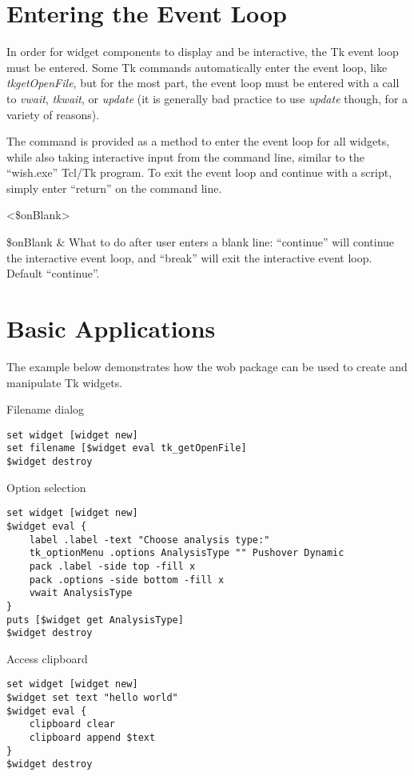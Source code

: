 \documentclass{article}
\renewcommand{\^}[1]{\textsuperscript{#1}}
\renewcommand{\_}[1]{\textsubscript{#1}}
\begin{document}
\section{Entering the Event Loop}
In order for widget components to display and be interactive, the Tk event loop must be entered. 
Some Tk commands automatically enter the event loop, like \textit{tk\textunderscore getOpenFile}, but for the most part, the event loop must be entered with a call to \textit{vwait}, \textit{tkwait}, or \textit{update} (it is generally bad practice to use \textit{update} though, for a variety of reasons). 

The command  is provided as a method to enter the event loop for all widgets, while also taking interactive input from the command line, similar to the ``wish.exe'' Tcl/Tk program.
To exit the event loop and continue with a script, simply enter ``return'' on the command line.
\begin{syntax}
   	 <\$onBlank>
\end{syntax}
\begin{args}
   	\$onBlank & What to do after user enters a blank line: ``continue'' will continue the interactive event loop, and ``break'' will exit the interactive event loop. Default ``continue''.
\end{args}

\clearpage
\section{Basic Applications}
The example below demonstrates how the wob package can be used to create and manipulate Tk widgets.
\begin{example}{Filename dialog}
\begin{lstlisting}
set widget [widget new]
set filename [$widget eval tk_getOpenFile]
$widget destroy
\end{lstlisting}
\end{example}

\begin{example}{Option selection}
\begin{lstlisting}
set widget [widget new]
$widget eval {
	label .label -text "Choose analysis type:"
	tk_optionMenu .options AnalysisType "" Pushover Dynamic
	pack .label -side top -fill x
	pack .options -side bottom -fill x
	vwait AnalysisType
}
puts [$widget get AnalysisType]
$widget destroy
\end{lstlisting}
\end{example}

\begin{example}{Access clipboard}
\begin{lstlisting}
set widget [widget new]
$widget set text "hello world"
$widget eval {
	clipboard clear
	clipboard append $text
}
$widget destroy
\end{lstlisting}
\end{example}
\end{document}
